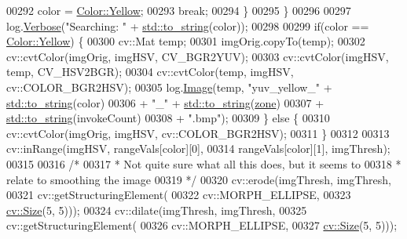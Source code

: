 \begin{DoxyCode}
00292                         color = \hyperlink{definitions_8hpp_abc05a0f46084a3477cf5d5c939ff1436a51e6cd92b6c45f9affdc158ecca2b8b8}{Color::Yellow};
00293                         \textcolor{keywordflow}{break};
00294                 \}
00295             \}
00296 
00297             log.\hyperlink{classChipChipArray_1_1Log_a154a5f38d9c7a767693b242684a3d4d9}{Verbose}(\textcolor{stringliteral}{"Searching: "} + \hyperlink{namespacestd_aa5ddf582a1c96ffe258c997be9a294a3}{std::to\_string}(color));
00298 
00299             \textcolor{keywordflow}{if}(color == \hyperlink{definitions_8hpp_abc05a0f46084a3477cf5d5c939ff1436a51e6cd92b6c45f9affdc158ecca2b8b8}{Color::Yellow}) \{
00300                 cv::Mat temp;
00301                 imgOrig.copyTo(temp);
00302                 cv::cvtColor(imgOrig, imgHSV, CV\_BGR2YUV);
00303                 cv::cvtColor(imgHSV, temp, CV\_HSV2BGR);
00304                 cv::cvtColor(temp, imgHSV, cv::COLOR\_BGR2HSV);
00305                 log.\hyperlink{classChipChipArray_1_1Log_a65bbab057c8b1453f9e4efcfee7522c4}{Image}(temp, \textcolor{stringliteral}{"yuv\_yellow\_"} + \hyperlink{namespacestd_aa5ddf582a1c96ffe258c997be9a294a3}{std::to\_string}(color)
00306                         + \textcolor{stringliteral}{"\_"} + \hyperlink{namespacestd_aa5ddf582a1c96ffe258c997be9a294a3}{std::to\_string}(\hyperlink{classChipChipArray_1_1Grabber_ab57efe6e0b6f369b19528285a278d967}{zone})
00307                         + \hyperlink{namespacestd_aa5ddf582a1c96ffe258c997be9a294a3}{std::to\_string}(invokeCount)
00308                         + \textcolor{stringliteral}{".bmp"});
00309             \} \textcolor{keywordflow}{else} \{
00310                 cv::cvtColor(imgOrig, imgHSV, cv::COLOR\_BGR2HSV);
00311             \}
00312 
00313             cv::inRange(imgHSV, rangeVals[color][0],
00314                     rangeVals[color][1], imgThresh);
00315 
00316             \textcolor{comment}{/* }
00317 \textcolor{comment}{             * Not quite sure what all this does, but it seems to}
00318 \textcolor{comment}{             * relate to smoothing the image}
00319 \textcolor{comment}{             */}
00320             cv::erode(imgThresh, imgThresh,
00321                     cv::getStructuringElement(
00322                         cv::MORPH\_ELLIPSE,
00323                         \hyperlink{definitions_8hpp_a9809446fd16a744b6df9808293f14153}{cv::Size}(5, 5)));
00324             cv::dilate(imgThresh, imgThresh,
00325                     cv::getStructuringElement(
00326                         cv::MORPH\_ELLIPSE,
00327                         \hyperlink{definitions_8hpp_a9809446fd16a744b6df9808293f14153}{cv::Size}(5, 5)));

\end{DoxyCode}
